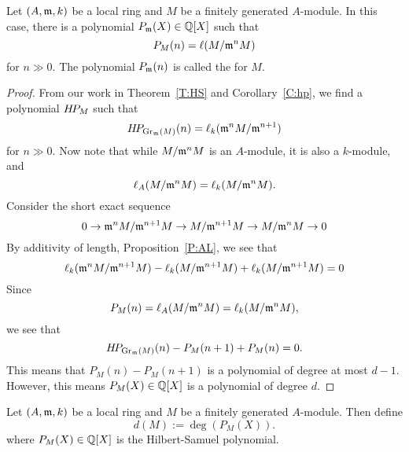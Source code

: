 \documentclass{ximera}
\begin{document}
\begin{theorem}\label{T:S}
  Let $(A,\mathfrak{m},k)$ be a local ring and $M$ be a finitely generated
  $A$-module. In this case, there is a polynomial $P_{\mathfrak{m}}(X)\in\mathbb Q[X]$
  such that
  \[
  P_M(n) = \ell(M/\mathfrak{m}^n M)
  \]
  for $n\gg 0$. The polynomial $P_{\mathfrak{m}}(n)$ is called the  for $M$.
  \begin{proof}
    From our work in Theorem~\ref{T:HS} and Corollary~\ref{C:hp}, we
    find a polynomial $H\!P_M$ such that
    \[
    H\!P_{\operatorname{Gr}_{\mathfrak{m}}(M)}(n) = \ell_{k}(\mathfrak{m}^n M/\mathfrak{m}^{n+1}) 
    \]
    for $n\gg 0$. Now note that while $M/\mathfrak{m}^nM$ is an $A$-module, it is
    also a $k$-module, and
    \[
    \ell_{A}(M/\mathfrak{m}^n M) = \ell_k(M/\mathfrak{m}^n M).
    \]
    Consider the short exact sequence
    \[
    0 \to \mathfrak{m}^n M/\mathfrak{m}^{n+1} M \to M/\mathfrak{m}^{n+1}M \to M/ \mathfrak{m}^n M\to 0
    \]
    By additivity of length, Proposition~\ref{P:AL}, we see that
    \[
    \ell_k(\mathfrak{m}^n M/\mathfrak{m}^{n+1} M) - \ell_k(M/\mathfrak{m}^{n+1}M) + \ell_k(M/\mathfrak{m}^{n+1}M) = 0
    \]
    Since
    \[
    P_M(n) = \ell_{A}(M/\mathfrak{m}^n M) = \ell_k(M/\mathfrak{m}^n M),
    \]
    we see that
    \[
    H\!P_{\operatorname{Gr}_{\mathfrak{m}}(M)}(n) - P_M(n+1) + P_M(n) = 0.
    \]
    This means that $P_M(n)- P_M(n+1)$ is a polynomial of degree at
    most $d-1$. However, this means $P_M(X)\in\mathbb Q[X]$ is a polynomial
    of degree $d$.
  \end{proof}
\end{theorem}



\begin{definition}
  Let $(A,\mathfrak{m},k)$ be a local ring and $M$ be a finitely generated
  $A$-module. Then define
  \[
  d(M) := \deg(P_M(X)).
  \]
  where $P_M(X)\in\mathbb Q[X]$ is the Hilbert-Samuel polynomial.
\end{definition}
\end{document}
